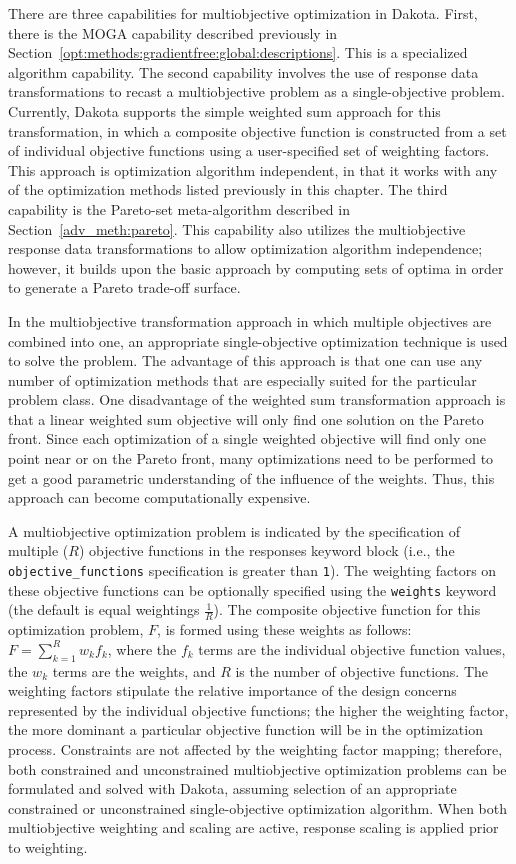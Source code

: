 There are three capabilities for multiobjective optimization in
Dakota. First, there is the MOGA capability described previously in
Section~\ref{opt:methods:gradientfree:global:descriptions}. This is a
specialized algorithm capability. The second capability involves the
use of response data transformations to recast a multiobjective
problem as a single-objective problem. Currently, Dakota supports the
simple weighted sum approach for this transformation, in which a
composite objective function is constructed from a set of individual
objective functions using a user-specified set of weighting
factors. This approach is optimization algorithm independent, in that
it works with any of the optimization methods listed previously in
this chapter.  The third capability is the Pareto-set meta-algorithm
described in Section~\ref{adv_meth:pareto}. This capability also
utilizes the multiobjective response data transformations to allow
optimization algorithm independence; however, it builds upon the basic
approach by computing sets of optima in order to generate a Pareto
trade-off surface.

In the multiobjective transformation approach in which multiple
objectives are combined into one, an appropriate single-objective
optimization technique is used to solve the problem. The advantage of
this approach is that one can use any number of optimization methods
that are especially suited for the particular problem class. One
disadvantage of the weighted sum transformation approach is that a
linear weighted sum objective will only find one solution on the
Pareto front.  Since each optimization of a single weighted objective
will find only one point near or on the Pareto front, many
optimizations need to be performed to get a good parametric
understanding of the influence of the weights.  Thus, this approach
can become computationally expensive.

A multiobjective optimization problem is indicated by the
specification of multiple ($R$) objective functions in the responses
keyword block (i.e., the \texttt{objective\_functions} specification
is greater than \texttt{1}). The weighting factors on these objective
functions can be optionally specified using the \texttt{weights}
keyword (the default is equal weightings $\frac{1}{R}$). The composite
objective function for this optimization problem, $F$, is formed using
these weights as follows: $F=\sum_{k=1}^{R}w_{k}f_{k}$, where the
$f_{k}$ terms are the individual objective function values, the
$w_{k}$ terms are the weights, and $R$ is the number of objective
functions. The weighting factors stipulate the relative importance of
the design concerns represented by the individual objective functions;
the higher the weighting factor, the more dominant a particular
objective function will be in the optimization process. Constraints
are not affected by the weighting factor mapping; therefore, both
constrained and unconstrained multiobjective optimization problems can
be formulated and solved with Dakota, assuming selection of an
appropriate constrained or unconstrained single-objective optimization
algorithm. When both multiobjective weighting and scaling are active,
response scaling is applied prior to weighting.

